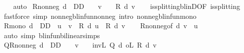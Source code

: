 \begin{isabellebody}
\ \ \isamarkupfalse%
\ auto%
\endisatagproof
{\isafoldproof}%
%
\isadelimproof
\isanewline
%
\endisadelimproof
\isanewline
{}\isamarkupfalse%
\ R{\isacharunderscore}{\kern0pt}nonneg{\isacharcolon}{\kern0pt}\ {\isachardoublequoteopen}d\ {\isasymin}\ D\isactrlsub D\ {\isasymLongrightarrow}\ {}\ {\isasymle}\ v\ {\isasymLongrightarrow}\ {}\ {\isasymle}\ R\ d\ v{\isachardoublequoteclose}\isanewline
%
\isadelimproof
\ \ %
\endisadelimproof
%
\isatagproof
{}\isamarkupfalse%
\ is{\isacharunderscore}{\kern0pt}splitting{\isacharunderscore}{\kern0pt}blinD{\isacharbrackleft}{\kern0pt}OF\ is{\isacharunderscore}{\kern0pt}splitting{\isacharbrackright}{\kern0pt}\isanewline
\ \ \isamarkupfalse%
\ {\isacharparenleft}{\kern0pt}fastforce\ simp{\isacharcolon}{\kern0pt}\ nonneg{\isacharunderscore}{\kern0pt}blinfun{\isacharunderscore}{\kern0pt}nonneg\ intro{\isacharcolon}{\kern0pt}\ nonneg{\isacharunderscore}{\kern0pt}blinfun{\isacharunderscore}{\kern0pt}mono{\isacharparenright}{\kern0pt}%
\endisatagproof
{\isafoldproof}%
%
\isadelimproof
\isanewline
%
\endisadelimproof
\isanewline
{}\isamarkupfalse%
\ R{\isacharunderscore}{\kern0pt}mono{\isacharcolon}{\kern0pt}\ {\isachardoublequoteopen}d\ {\isasymin}\ D\isactrlsub D\ {\isasymLongrightarrow}\ u\ {\isasymle}\ v\ {\isasymLongrightarrow}\ {\isacharparenleft}{\kern0pt}R\ d{\isacharparenright}{\kern0pt}\ u\ {\isasymle}\ {\isacharparenleft}{\kern0pt}R\ d{\isacharparenright}{\kern0pt}\ v{\isachardoublequoteclose}\isanewline
%
\isadelimproof
\ \ %
\endisadelimproof
%
\isatagproof
{}\isamarkupfalse%
\ R{\isacharunderscore}{\kern0pt}nonneg{\isacharbrackleft}{\kern0pt}of\ d\ {\isachardoublequoteopen}v\ {\isacharminus}{\kern0pt}\ u{\isachardoublequoteclose}{\isacharbrackright}{\kern0pt}\isanewline
\ \ \isamarkupfalse%
\ {\isacharparenleft}{\kern0pt}auto\ simp{\isacharcolon}{\kern0pt}\ blinfun{\isachardot}{\kern0pt}bilinear{\isacharunderscore}{\kern0pt}simps{\isacharparenright}{\kern0pt}%
\endisatagproof
{\isafoldproof}%
%
\isadelimproof
\isanewline
%
\endisadelimproof
\isanewline
{}\isamarkupfalse%
\ QR{\isacharunderscore}{\kern0pt}nonneg{\isacharcolon}{\kern0pt}\ {\isachardoublequoteopen}d\ {\isasymin}\ D\isactrlsub D\ {\isasymLongrightarrow}\ {}\ {\isasymle}\ v\ {\isasymLongrightarrow}\ {}\ {\isasymle}\ {\isacharparenleft}{\kern0pt}inv\isactrlsub L\ {\isacharparenleft}{\kern0pt}Q\ d{\isacharparenright}{\kern0pt}\ o\isactrlsub L\ R\ d{\isacharparenright}{\kern0pt}\ v{\isachardoublequoteclose}\isanewline

\end{isabellebody}
